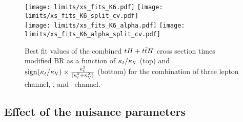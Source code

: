\begin{figure} [!h]
 \centering
 \texttt{[image: limits/xs\_fits\_K6.pdf]}
 \texttt{[image: limits/xs\_fits\_K6\_split\_cv.pdf]}\\
 \texttt{[image: limits/xs\_fits\_K6\_alpha.pdf]}
 \texttt{[image: limits/xs\_fits\_K6\_alpha\_split\_cv.pdf]}
\caption[Best fit values of the combined $\tH+\ttH$ $\sigma\times$BR]{Best fit values of the combined $\tH+\ttH$ cross section times modified BR as a function of $\kappa_t/\kappa_\text{V}$ (top) and $\mathrm{sign}(\kappa_t/\kappa_\text{V})\times\frac{\kappa_t^2}{(\kappa_t^2+\kappa_\text{V}^2)}$ (bottom) for the combination of three lepton channel, \mumu, and \emu\ channel.}
\label{fig:xs_fits_cv}
\end{figure}




\subsection{Effect of the nuisance parameters}

